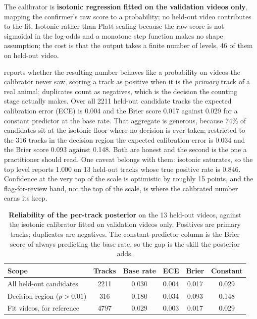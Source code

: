 The calibrator is \textbf{isotonic regression fitted on the validation videos only}, mapping
the confirmer's raw score to a probability; no held-out video contributes to the fit. Isotonic
rather than Platt scaling because the raw score is not sigmoidal in the log-odds and a
monotone step function makes no shape assumption; the cost is that the output takes a finite
number of levels, 46 of them on held-out video.

 reports whether the resulting number behaves like a probability on videos the
calibrator never saw, scoring a track as positive when it is the \emph{primary} track of a real animal; duplicates count as negatives, which is the decision the counting stage
actually makes. Over all 2211 held-out candidate tracks the expected calibration error (ECE) is 0.004 and the Brier score 0.017 against 0.029 for a constant predictor at the base rate. That
aggregate is generous, because 74\% of candidates sit at the isotonic floor where no decision
is ever taken; restricted to the 316 tracks in the decision region the expected calibration
error is 0.034 and the Brier score 0.093 against 0.148. Both are honest and the second is the
one a practitioner should read. One caveat belongs with them: isotonic saturates, so the top
level reports 1.000 on 13 held-out tracks whose true positive rate is 0.846. Confidence at the
very top of the scale is optimistic by roughly 15 points, and the flag-for-review band, not
the top of the scale, is where the calibrated number earns its keep.

\begin{table}[H]
\caption{\textbf{Reliability of the per-track posterior} on the 13 held-out videos, against
the isotonic calibrator fitted on validation videos only. Positives are primary tracks;
duplicates are negatives. The constant-predictor column is the Brier score of always
predicting the base rate, so the gap is the skill the posterior
adds.\label{tab:calib}}
\centering\footnotesize
\begin{tabularx}{\textwidth}{LCCCCC}
\toprule
\textbf{Scope} & \textbf{Tracks} & \textbf{Base rate} & \textbf{ECE} & \textbf{Brier} & \textbf{Constant} \\
\midrule
All held-out candidates & 2211 & 0.030 & 0.004 & 0.017 & 0.029 \\
Decision region ($p>0.01$) & 316 & 0.180 & 0.034 & 0.093 & 0.148 \\
\midrule
Fit videos, for reference & 4797 & 0.029 & 0.003 & 0.017 & 0.029 \\
\bottomrule
\end{tabularx}
\end{table}

